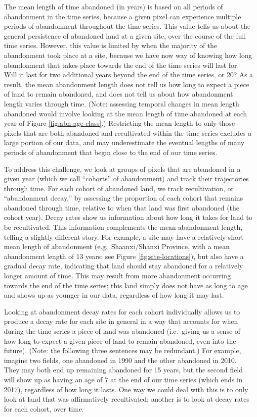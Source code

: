 \documentclass[
]{article}
\begin{document}
The mean length of time abandoned (in years) is based on all periods of abandonment in the time series, because a given pixel can experience multiple periods of abandonment throughout the time series.
This value tells us about the general persistence of abandoned land at a given site, over the course of the full time series.
However, this value is limited by when the majority of the abandonment took place at a site, because we have now way of knowing how long abandonment that takes place towards the end of the time series will last for. Will it last for two additional years beyond the end of the time series, or 20?
As a result, the mean abandonment length does not tell us how long to expect a piece of land to remain abandoned, and does not tell us about how abandonment length varies through time. (Note: assessing temporal changes in mean length abandoned would involve looking at the mean length of time abandoned at each year of Figure \ref{fig:abn-age-class}.)
Restricting the mean length to only those pixels that are both abandoned and recultivated within the time series excludes a large portion of our data, and may underestimate the eventual lengths of many periods of abandonment that begin close to the end of our time series.

To address this challenge, we look at groups of pixels that are abandoned in a given year (which we call ``cohorts'' of abandonment) and track their trajectories through time.
For each cohort of abandoned land, we track recultivation, or ``abandonment decay,'' by assessing the proportion of each cohort that remains abandoned through time, relative to when that land was first abandoned (the cohort year).
Decay rates show us information about how long it takes for land to be recultivated.
This information complements the mean abandonment length, telling a slightly different story.
For example, a site may have a relatively short mean length of abandonment (e.g.~Shaanxi/Shanxi Province, with a mean abandonment length of 13 years; see Figure \ref{fig:site-locations}), but also have a gradual decay rate, indicating that land should stay abandoned for a relatively longer amount of time.
This may result from more abandonment occurring towards the end of the time series; this land simply does not have as long to age and shows up as younger in our data, regardless of how long it may last.

Looking at abandonment decay rates for each cohort individually allows us to produce a decay rate for each site in general in a way that accounts for when during the time series a piece of land was abandoned (i.e.~giving us a sense of how long to expect a given piece of land to remain abandoned, even into the future).
(Note: the following three sentences may be redundant.)
For example, imagine two fields, one abandoned in 1990 and the other abandoned in 2010.
They may both end up remaining abandoned for 15 years, but the second field will show up as having an age of 7 at the end of our time series (which ends in 2017), regardless of how long it lasts.
One way we could deal with this is to only look at land that was affirmatively recultivated; another is to look at decay rates for each cohort, over time.
\end{document}
